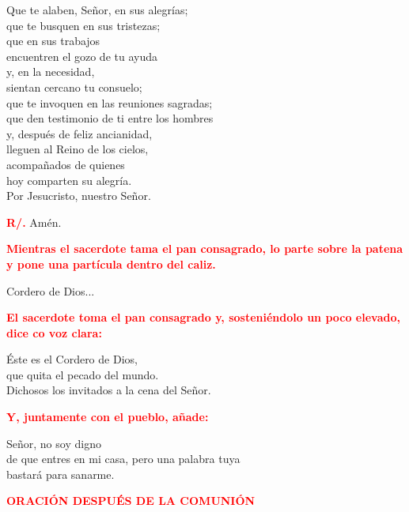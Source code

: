 \documentclass[12pt, letterpaper, spanish]{report}
\begin{document}
Que te alaben, Se\~nor, en sus alegr\'ias;\\
que te busquen en sus tristezas;\\
que en sus trabajos\\
encuentren el gozo de tu ayuda\\
y, en la necesidad,\\
sientan cercano tu consuelo;\\
que te invoquen en las reuniones sagradas;\\
que den testimonio de ti entre los hombres\\
y, despu\'es de feliz ancianidad,\\
lleguen al Reino de los cielos,\\
acompa\~nados de quienes\\
hoy comparten su alegr\'ia.\\
Por Jesucristo, nuestro Se\~nor.\newline

\Large \hspace{-0.9cm} {\bfseries \textcolor{red}{R/.}} \hspace{0.5cm} Am\'en.\newline

\large{\bfseries \textcolor{red}{Mientras el sacerdote tama el pan consagrado, lo parte sobre la patena y pone una part\'icula dentro del caliz.}}\newline

\Large Cordero de Dios...\newline

\large{\bfseries \textcolor{red}{El sacerdote toma el pan consagrado y, sosteni\'endolo un poco elevado, dice co voz clara:}}\newline

\Large \'Este es el Cordero de Dios,\\
que quita el pecado del mundo.\\
Dichosos los invitados a la cena del Se\~nor.\newline

\newpage

\large{\bfseries \textcolor{red}{Y, juntamente con el pueblo, a\~nade:}}\newline

\Large Se\~nor, no soy digno\\
de que entres en mi casa,
pero una palabra tuya\\
bastar\'a para sanarme.\newline

\Large {\bfseries \textcolor{red}{ORACI\'ON DESPU\'ES DE LA COMUNI\'ON}}
\end{document}
